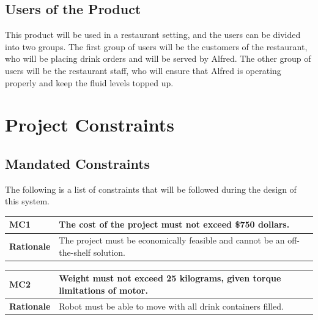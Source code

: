 \documentclass [11pt]{article}
\begin{document}
\subsection{Users of the Product} 
This product will be used in a restaurant setting, and the users can be divided into two groups. The first group of users will be the customers of the restaurant, who will be placing drink orders and will be served by Alfred. The other group of users will be the restaurant staff, who will ensure that Alfred is operating properly and keep the fluid levels topped up.



\section{\textbf{Project Constraints}}

\subsection{Mandated Constraints}
The following is a list of constraints that will be followed during the design of this system.

\begin{longtable}{| p{ } | p{ } | }\hline 
\rowcolor{tableCell}\textbf{MC1} & \textbf{The cost of the project must not exceed \$750 dollars.} \\ \hline
\textbf{Rationale} & The project must be economically feasible and cannot be an off-the-shelf solution.\\ \hline 
\end{longtable}

\begin{longtable}{| p{ } | p{ } | }\hline 
\rowcolor{tableCell}\textbf{MC2}& \textbf{Weight must not exceed 25 kilograms, given torque limitations of motor.}\\ \hline 
\textbf{Rationale} & Robot must be able to move with all drink containers filled.\\ \hline 
\end{longtable}
\end{document}
